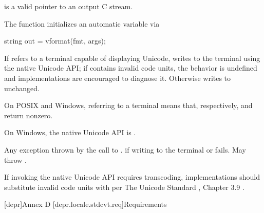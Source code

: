 \documentclass{wg21}
\begin{document}
\begin{itemdescr}
    \pnum
    \expects
     is a valid pointer to an output C stream.

    \pnum
    \effects
    The function initializes an automatic variable via
    \begin{codeblock}
        string out = vformat(fmt, args);
    \end{codeblock}
    If  refers to a terminal capable of displaying Unicode,
    writes  to the terminal using the native Unicode API;
    if  contains invalid code units,
    the behavior is undefined and
    implementations are encouraged to diagnose it.
    Otherwise writes  to  unchanged.
    \begin{note}
        On POSIX and Windows,  referring to a terminal means that,
        respectively,
         and
        return nonzero.
    \end{note}
    \begin{note}
        On Windows, the native Unicode API is .
    \end{note}

    \pnum
    \throws
    Any exception thrown by the call to .
     if writing to the terminal or  fails.
    May throw .

    \pnum
    \recommended
    If invoking the native Unicode API requires transcoding,
    implementations should substitute invalid code units
    with  per
    The Unicode Standard , Chapter 3.9 .
\end{itemdescr}

[depr]{Annex D}
[depr.locale.stdcvt.req]{Requirements}
\end{document}
